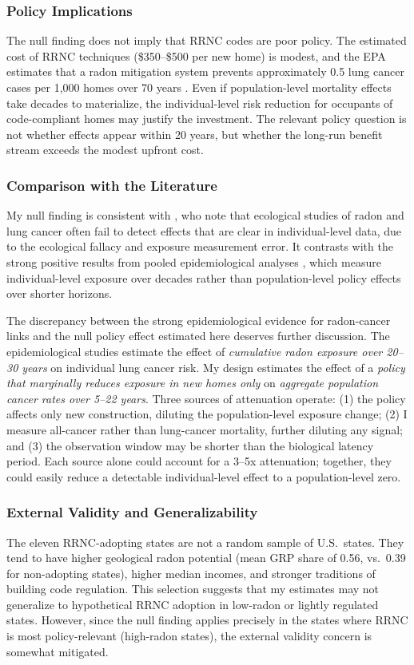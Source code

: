 \documentclass[12pt]{article}
\begin{document}
\subsubsection*{Policy Implications} The null finding does not imply that RRNC codes are poor policy. The estimated cost of RRNC techniques (\$350--\$500 per new home) is modest, and the EPA estimates that a radon mitigation system prevents approximately 0.5 lung cancer cases per 1,000 homes over 70 years \citep{epa2003assessment}. Even if population-level mortality effects take decades to materialize, the individual-level risk reduction for occupants of code-compliant homes may justify the investment. The relevant policy question is not whether effects appear within 20 years, but whether the long-run benefit stream exceeds the modest upfront cost.

\subsubsection*{Comparison with the Literature} My null finding is consistent with \citet{field2000residential}, who note that ecological studies of radon and lung cancer often fail to detect effects that are clear in individual-level data, due to the ecological fallacy and exposure measurement error. It contrasts with the strong positive results from pooled epidemiological analyses \citep{darby2005radon, krewski2005residential}, which measure individual-level exposure over decades rather than population-level policy effects over shorter horizons.

The discrepancy between the strong epidemiological evidence for radon-cancer links and the null policy effect estimated here deserves further discussion. The epidemiological studies estimate the effect of \emph{cumulative radon exposure over 20--30 years} on individual lung cancer risk. My design estimates the effect of a \emph{policy that marginally reduces exposure in new homes only} on \emph{aggregate population cancer rates over 5--22 years}. Three sources of attenuation operate: (1) the policy affects only new construction, diluting the population-level exposure change; (2) I measure all-cancer rather than lung-cancer mortality, further diluting any signal; and (3) the observation window may be shorter than the biological latency period. Each source alone could account for a 3--5x attenuation; together, they could easily reduce a detectable individual-level effect to a population-level zero.

\subsubsection*{External Validity and Generalizability} The eleven RRNC-adopting states are not a random sample of U.S.\ states. They tend to have higher geological radon potential (mean GRP share of 0.56, vs.\ 0.39 for non-adopting states), higher median incomes, and stronger traditions of building code regulation. This selection suggests that my estimates may not generalize to hypothetical RRNC adoption in low-radon or lightly regulated states. However, since the null finding applies precisely in the states where RRNC is most policy-relevant (high-radon states), the external validity concern is somewhat mitigated.
\end{document}
